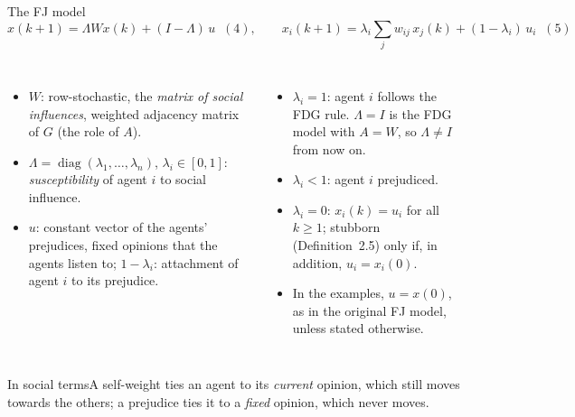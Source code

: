 \documentclass[10pt, aspectratio=169]{beamer}
\newcommand{\socially}[1]{%
  \begin{minipage}{0.76\textwidth}
    \begin{exampleblock}{In social terms}\footnotesize #1\end{exampleblock}
  \end{minipage}}
\begin{document}
\begin{frame}[label=m-fj-model]{The FJ model}
  \[ x(k+1) = \Lambda W x(k) + (I - \Lambda)\, u \;\; (4), \qquad
     x_i(k+1) = \lambda_i \textstyle\sum_{j} w_{ij}\, x_j(k) + (1-\lambda_i)\, u_i
     \;\; (5) \]
  \begin{columns}[T]
      \footnotesize
      \begin{itemize}
        \item $W$: row-stochastic, the \emph{matrix of social influences}, weighted
              adjacency matrix of $G$ (the role of $A$).
        \item $\Lambda = \operatorname{diag}(\lambda_1, \dots, \lambda_n)$,
              $\lambda_i \in [0,1]$: \emph{susceptibility} of agent $i$ to social
              influence.
        \item $u$: constant vector of the agents' \alert{prejudices}, fixed opinions that
              the agents listen to; $1 - \lambda_i$: \alert{attachment} of agent $i$ to its
              prejudice.
      \end{itemize}
      \footnotesize
      \begin{itemize}
        \item $\lambda_i = 1$: agent $i$ follows the FDG rule. $\Lambda = I$ is the FDG
              model with $A = W$, so $\Lambda \neq I$ from now on.
        \item $\lambda_i < 1$: agent $i$ \alert{prejudiced}.
        \item $\lambda_i = 0$: $x_i(k) = u_i$ for all $k \geq 1$; \alert{stubborn}
              (Definition~2.5) only if, in addition, $u_i = x_i(0)$.
        \item In the examples, $u = x(0)$, as in the original FJ model, unless stated
              otherwise.
      \end{itemize}
  \end{columns}
  \vspace{3mm}
  \socially{A self-weight ties an agent to its \emph{current} opinion, which still moves
  towards the others; a prejudice ties it to a \emph{fixed} opinion, which never moves.}
\end{frame}
\end{document}
